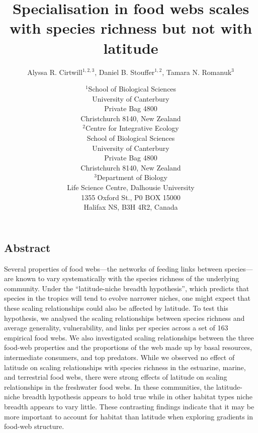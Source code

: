 \documentclass[12pt]{article}
\begin{document}
\title{Specialisation in food webs scales with species richness but not with latitude}
\author{Alyssa R. Cirtwill$^{1,2,3}$, Daniel B. Stouffer$^{1,2}$, Tamara N. Romanuk$^{3}$}
\date{\small$^1$School of Biological Sciences\\University of Canterbury\\
Private Bag 4800\\Christchurch 8140, New Zealand \\
\medskip$^2$Centre for Integrative Ecology\\School of Biological Sciences\\University of Canterbury\\
Private Bag 4800\\Christchurch 8140, New Zealand \\
\medskip$^3$Department of Biology\\
Life Science Centre, Dalhousie University\\1355 Oxford St., P0 BOX 15000\\
Halifax NS, B3H 4R2, Canada\\}

\maketitle
\baselineskip=8.5mm
 
\vspace{-0.3 in}

\begin{spacing}{1.0}
\section*{Abstract}

Several properties of food webs---the networks of feeding links between
species---are known to vary systematically with the species richness of the underlying
community.  Under the ``latitude-niche breadth hypothesis'', which predicts
that species in the tropics will tend to evolve narrower niches, one might
expect that these scaling relationships could also be affected by latitude. To
test this hypothesis, we analysed the scaling relationships between species
richness and average generality, vulnerability, and links per species across a
set of 163 empirical food webs.  We also investigated scaling relationships
between the three food-web properties and the proportions of the web made up
by basal resources, intermediate consumers, and top predators. While we
observed no effect of latitude on scaling relationships with species richness
in the estuarine, marine, and terrestrial food webs, there were strong effects
of latitude on scaling relationships in the freshwater food webs. In these
communities, the latitude-niche breadth hypothesis appears to hold true while
in other habitat types niche breadth appears to vary little. These contrasting
findings indicate that it may be more important to account for habitat than
latitude when exploring gradients in food-web structure.

\end{spacing}
\end{document}

